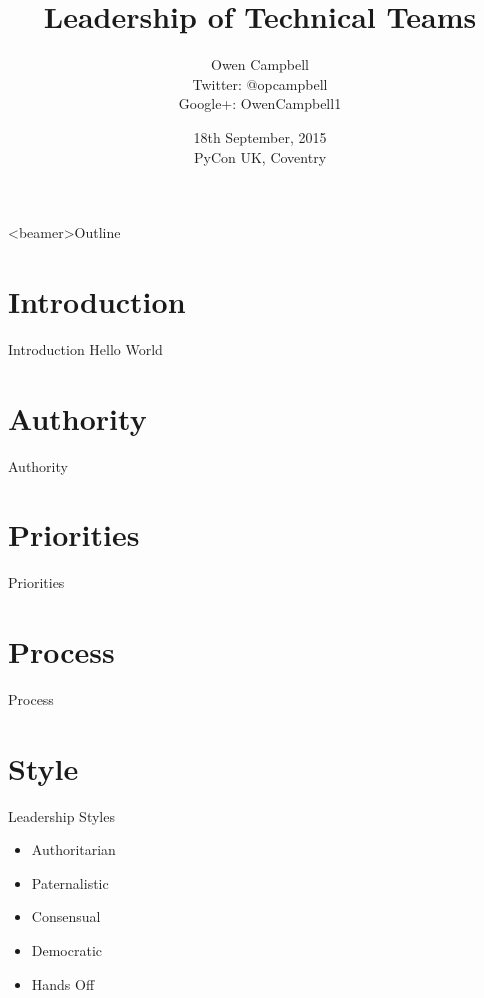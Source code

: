 \documentclass{beamer}
\title{Leadership of Technical Teams}
\author{
  Owen Campbell\\
  \vspace{1cm}
  Twitter: @opcampbell\\
  Google+: OwenCampbell1
}
\date[PyCon UK 2015]{18th September, 2015\\PyCon UK, Coventry}
\begin{document}
\begin{frame}
  \titlepage{}
\end{frame}

{
  \begin{frame}<beamer>{Outline}
    \tableofcontents
  \end{frame}
}

  \section{Introduction}

    \begin{frame}{Introduction}
      Hello World
    \end{frame}


  \section{Authority}

    \begin{frame}{Authority}
    \end{frame}

  \section{Priorities}

    \begin{frame}{Priorities}
      
    \end{frame}

  \section{Process}

    \begin{frame}{Process}
    \end{frame}

  \section{Style}

    \begin{frame}{Leadership Styles}
      \begin{itemize}
        \item Authoritarian
        \item Paternalistic
        \item Consensual
        \item Democratic
        \item Hands Off
      \end{itemize}
    \end{frame}
\end{document}
